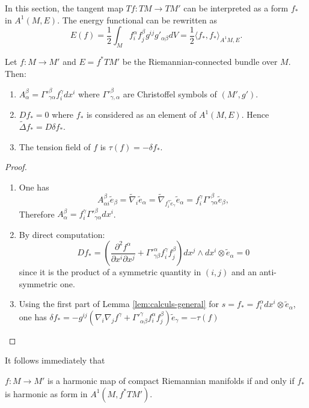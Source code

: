 In this section, the tangent map \(Tf: TM \longrightarrow TM'\) can be interpreted as a form \(f_*\) in
\(A^1(M, E)\). The energy functional can be rewritten as
\[
 E(f) = \frac{1}{2}\int_M f^\alpha_i f^\beta_j g^{ij}g'_{\alpha\beta}dV =\frac{1}{2}\langle f_*, f_* \rangle_{A^1{M,E}}.
\]


\begin{proposition}
\label{prop:calculs-pullback-tangent}
Let \(f: M \longrightarrow M'\) and \(E = f^* TM'\) be the Riemannian-connected bundle
over \(M\). Then:
\begin{enumerate}
\item \(A^\beta_\alpha = \Gamma'^{\beta}_{\gamma\alpha} f_i^\gamma dx^i\) where \(\Gamma'^{\beta}_{\gamma,\alpha}\) are Christoffel symbols of \((M',g')\).
\item \(Df_* = 0\) where \(f_*\) is considered as an element of \(A^1(M,E)\). Hence \(\tilde\Delta f_*= D\delta f_*\).
\item The tension field of \(f\) is \(\tau (f) = -\delta f_*\).
\end{enumerate}
\end{proposition}
\begin{proof}
\begin{enumerate}
\item One has
\[
    A^\beta_{\alpha i} \tilde e_\beta = \tilde\nabla_i \tilde e_\alpha =
   \tilde\nabla_{f^\gamma_i \tilde e_\gamma} \tilde e_\alpha = f^\gamma_i
   \Gamma'^\beta_{\gamma\alpha}\tilde e_\beta,
   \]
Therefore \(A^\beta_\alpha = f^\gamma_i
   \Gamma'^\beta_{\gamma\alpha} dx^i\).
\item By direct computation:
\[
    D f_* = \left(\frac{\partial^2 f^\alpha}{\partial x^i \partial x^j} +
   \Gamma'^\alpha_{\gamma\beta} f^\gamma_i f^\beta_j \right)dx^j\wedge dx^i\otimes
   \tilde e_\alpha = 0 
   \]
since it is the product of a symmetric quantity in \((i,j)\) and an anti-symmetric one.
\item Using the first part of Lemma \ref{lem:calculs-general} for \(s=f_* = f^\alpha_i dx^i\otimes
   \tilde e_\alpha\), one has \(\delta f_* = -g^{ij}\left(\nabla_i\nabla_j f^\gamma +
   \Gamma'^\gamma_{\alpha\beta} f^\alpha_i f^\beta_j\right)\tilde e_\gamma=-\tau(f)\)
\end{enumerate}
\end{proof}

It follows immediately that
\begin{corollary}
\(f: M \longrightarrow M'\) is a harmonic map of compact Riemannian manifolds if and only if \(f_*\) is harmonic as form in \(A^1(M,f^* TM')\).
\end{corollary}

